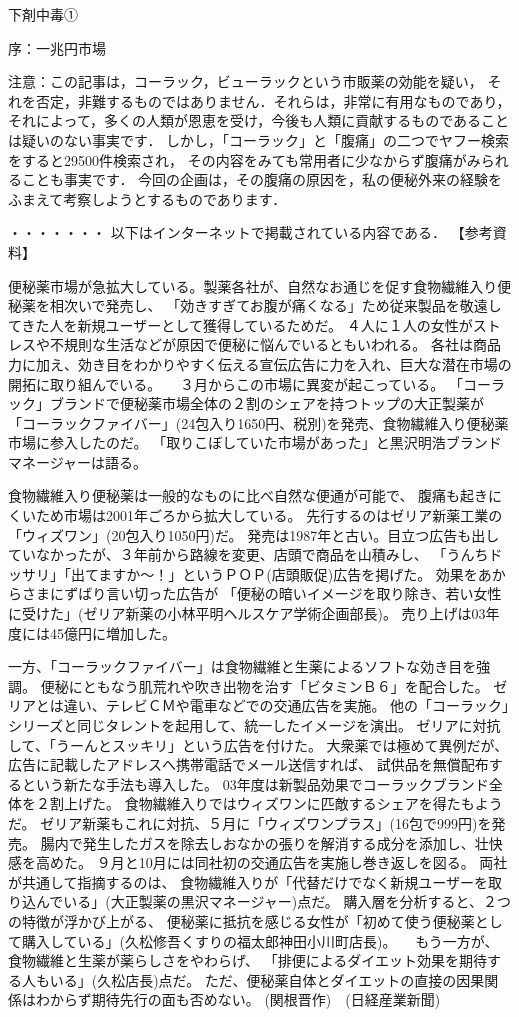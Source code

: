 下剤中毒①

序：一兆円市場

注意：この記事は，コーラック，ビューラックという市販薬の効能を疑い，
それを否定，非難するものではありません．それらは，非常に有用なものであり，
それによって，多くの人類が恩恵を受け，今後も人類に貢献するものであることは疑いのない事実です．
しかし，「コーラック」と「腹痛」の二つでヤフー検索をすると29500件検索され，
その内容をみても常用者に少なからず腹痛がみられることも事実です．
今回の企画は，その腹痛の原因を，私の便秘外来の経験をふまえて考察しようとするものであります．

・・・・・・・
以下はインターネットで掲載されている内容である．
【参考資料】 


便秘薬市場が急拡大している。製薬各社が、自然なお通じを促す食物繊維入り便秘薬を相次いで発売し、
「効きすぎてお腹が痛くなる」ため従来製品を敬遠してきた人を新規ユーザーとして獲得しているためだ。
４人に１人の女性がストレスや不規則な生活などが原因で便秘に悩んでいるともいわれる。
各社は商品力に加え、効き目をわかりやすく伝える宣伝広告に力を入れ、巨大な潜在市場の開拓に取り組んでいる。
　３月からこの市場に異変が起こっている。
「コーラック」ブランドで便秘薬市場全体の２割のシェアを持つトップの大正製薬が
「コーラックファイバー」(24包入り1650円、税別)を発売、食物繊維入り便秘薬市場に参入したのだ。
「取りこぼしていた市場があった」と黒沢明浩ブランドマネージャーは語る。 

食物繊維入り便秘薬は一般的なものに比べ自然な便通が可能で、
腹痛も起きにくいため市場は2001年ごろから拡大している。
先行するのはゼリア新薬工業の「ウィズワン」(20包入り1050円)だ。
発売は1987年と古い。目立つ広告も出していなかったが、３年前から路線を変更、店頭で商品を山積みし、
「うんちドッサリ」「出てますか～！」というＰＯＰ(店頭販促)広告を掲げた。
効果をあからさまにずばり言い切った広告が
「便秘の暗いイメージを取り除き、若い女性に受けた」(ゼリア新薬の小林平明ヘルスケア学術企画部長)。
売り上げは03年度には45億円に増加した。

一方、「コーラックファイバー」は食物繊維と生薬によるソフトな効き目を強調。
便秘にともなう肌荒れや吹き出物を治す「ビタミンＢ６」を配合した。 
ゼリアとは違い、テレビＣＭや電車などでの交通広告を実施。
他の「コーラック」シリーズと同じタレントを起用して、統一したイメージを演出。
ゼリアに対抗して、「うーんとスッキリ」という広告を付けた。
大衆薬では極めて異例だが、広告に記載したアドレスへ携帯電話でメール送信すれば、
試供品を無償配布するという新たな手法も導入した。 
03年度は新製品効果でコーラックブランド全体を２割上げた。
食物繊維入りではウィズワンに匹敵するシェアを得たもようだ。
ゼリア新薬もこれに対抗、５月に「ウィズワンプラス」(16包で999円)を発売。
腸内で発生したガスを除去しおなかの張りを解消する成分を添加し、壮快感を高めた。
９月と10月には同社初の交通広告を実施し巻き返しを図る。 
両社が共通して指摘するのは、
食物繊維入りが「代替だけでなく新規ユーザーを取り込んでいる」(大正製薬の黒沢マネージャー)点だ。
購入層を分析すると、２つの特徴が浮かび上がる、
便秘薬に抵抗を感じる女性が「初めて使う便秘薬として購入している」(久松修吾くすりの福太郎神田小川町店長)。
 　もう一方が、食物繊維と生薬が薬らしさをやわらげ、
「排便によるダイエット効果を期待する人もいる」(久松店長)点だ。
ただ、便秘薬自体とダイエットの直接の因果関係はわからず期待先行の面も否めない。 (関根晋作)　(日経産業新聞) 


